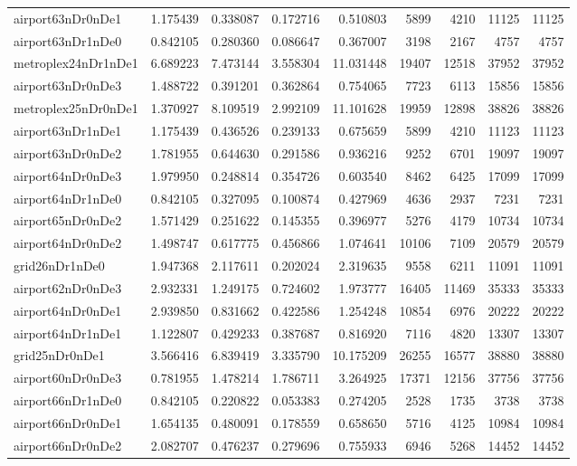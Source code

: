 \begin{longtable}{|l|r|r|r|r|r|r|r|r|}
airport63nDr0nDe1 & 1.175439 & 0.338087 & 0.172716 & 0.510803 & 5899 & 4210 & 11125 & 11125 \\
airport63nDr1nDe0 & 0.842105 & 0.280360 & 0.086647 & 0.367007 & 3198 & 2167 & 4757 & 4757 \\
metroplex24nDr1nDe1 & 6.689223 & 7.473144 & 3.558304 & 11.031448 & 19407 & 12518 & 37952 & 37952 \\
airport63nDr0nDe3 & 1.488722 & 0.391201 & 0.362864 & 0.754065 & 7723 & 6113 & 15856 & 15856 \\
metroplex25nDr0nDe1 & 1.370927 & 8.109519 & 2.992109 & 11.101628 & 19959 & 12898 & 38826 & 38826 \\
airport63nDr1nDe1 & 1.175439 & 0.436526 & 0.239133 & 0.675659 & 5899 & 4210 & 11123 & 11123 \\
airport63nDr0nDe2 & 1.781955 & 0.644630 & 0.291586 & 0.936216 & 9252 & 6701 & 19097 & 19097 \\
airport64nDr0nDe3 & 1.979950 & 0.248814 & 0.354726 & 0.603540 & 8462 & 6425 & 17099 & 17099 \\
airport64nDr1nDe0 & 0.842105 & 0.327095 & 0.100874 & 0.427969 & 4636 & 2937 & 7231 & 7231 \\
airport65nDr0nDe2 & 1.571429 & 0.251622 & 0.145355 & 0.396977 & 5276 & 4179 & 10734 & 10734 \\
airport64nDr0nDe2 & 1.498747 & 0.617775 & 0.456866 & 1.074641 & 10106 & 7109 & 20579 & 20579 \\
grid26nDr1nDe0 & 1.947368 & 2.117611 & 0.202024 & 2.319635 & 9558 & 6211 & 11091 & 11091 \\
airport62nDr0nDe3 & 2.932331 & 1.249175 & 0.724602 & 1.973777 & 16405 & 11469 & 35333 & 35333 \\
airport64nDr0nDe1 & 2.939850 & 0.831662 & 0.422586 & 1.254248 & 10854 & 6976 & 20222 & 20222 \\
airport64nDr1nDe1 & 1.122807 & 0.429233 & 0.387687 & 0.816920 & 7116 & 4820 & 13307 & 13307 \\
grid25nDr0nDe1 & 3.566416 & 6.839419 & 3.335790 & 10.175209 & 26255 & 16577 & 38880 & 38880 \\
airport60nDr0nDe3 & 0.781955 & 1.478214 & 1.786711 & 3.264925 & 17371 & 12156 & 37756 & 37756 \\
airport66nDr1nDe0 & 0.842105 & 0.220822 & 0.053383 & 0.274205 & 2528 & 1735 & 3738 & 3738 \\
airport66nDr0nDe1 & 1.654135 & 0.480091 & 0.178559 & 0.658650 & 5716 & 4125 & 10984 & 10984 \\
airport66nDr0nDe2 & 2.082707 & 0.476237 & 0.279696 & 0.755933 & 6946 & 5268 & 14452 & 14452 \\

\end{longtable}
